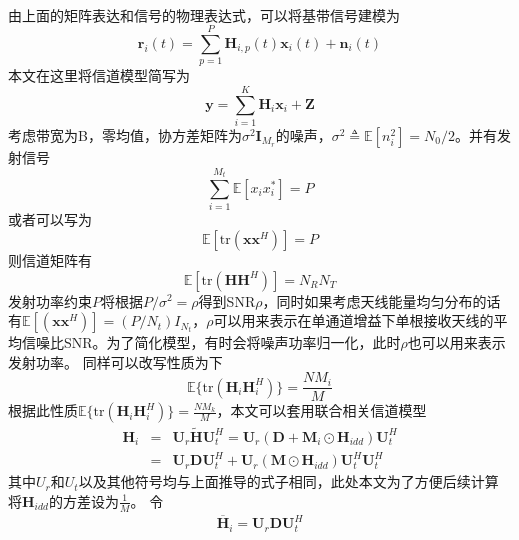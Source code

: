 \documentclass[bachelor,nocolorlinks, printoneside]{seuthesis} %
\begin{document}
\begin{Main}
\begin{eqnarray}
\end{eqnarray}
由上面的矩阵表达和信号的物理表达式，可以将基带信号建模为
\begin{equation}\label{key}
\mathbf{r}_{i}(t) = \sum_{p=1}^{P}\mathbf{H}_{i,p}(t)\mathbf{x}_{i}(t) + \mathbf{n}_{i}(t)
\end{equation}
本文在这里将信道模型简写为
\begin{equation}\label{key}
\mathbf{y} = \sum_{i=1}^{K} \mathbf{H}_i \mathbf{x}_i + \mathbf{Z}
\end{equation}
考虑带宽为B，零均值，协方差矩阵为$\sigma^{2}\mathbf{I}_{M_{r}}$的噪声，$\sigma^{2} \triangleq \mathbb{E}[n^{2}_{i}]= N_{0}/2$。并有发射信号
\begin{equation}\label{key}
\sum_{i=1}^{M_{t}}\mathbb{E}[x_{i}x_{i}^{*}] = P
\end{equation}
或者可以写为
\begin{equation}\label{key}
\mathbb{E}[\mathrm{tr}(\mathbf{x}\mathbf{x}^{H})] = P
\end{equation}
则信道矩阵有
\begin{equation}\label{key}
\mathbb{E}[\mathrm{tr}(\mathbf{H}\mathbf{H}^{H})] = N_{R}N_{T}
\end{equation}
发射功率约束$P$将根据$P/\sigma^{2} = \rho$得到SNR$\rho$，同时如果考虑天线能量均匀分布的话有$\mathbb{E}[(\mathbf{x}\mathbf{x}^{H})] = (P/N_{t})I_{N_{t}} $，$\rho$可以用来表示在单通道增益下单根接收天线的平均信噪比SNR。为了简化模型，有时会将噪声功率归一化，此时$\rho$也可以用来表示发射功率。
同样可以改写性质为下
\begin{equation}\label{key}
\mathbb{E} \lbrace \mathrm{tr} (\mathbf{H}_i \mathbf{H}_i^H ) \rbrace = \frac{N M_i}{M}
\end{equation}
根据此性质$\mathbb{E} \lbrace \mathrm{tr} (\mathbf{H}_i \mathbf{H}_i^H ) \rbrace = \frac{N M_k}{M}$，本文可以套用联合相关信道模型
\begin{eqnarray}\label{key}
\mathbf{H}_i & = & \mathbf{U}_{r}\tilde{\mathbf{H}}\mathbf{U}_{t}^{H} = \mathbf{U}_{r}(\mathbf{D}+\mathbf{M}_i\odot \mathbf{H}_{idd})\mathbf{U}_{t}^{H} \\ \nonumber
& = & \mathbf{U}_{r}\mathbf{D}\mathbf{U}_{t}^{H} + \mathbf{U}_{r}(\mathbf{M}\odot \mathbf{H}_{idd})\mathbf{U}_{t}^{H}\mathbf{U}_{t}^{H}
\end{eqnarray}
其中$U_r$和$U_t$以及其他符号均与上面推导的式子相同，此处本文为了方便后续计算将$\mathbf{H}_{idd}$的方差设为$\frac{1}{M}$。
令
\begin{gather}\label{key}
\overline{\mathbf{H}}_i = \mathbf{U}_{r}\mathbf{D}\mathbf{U}_{t}^{H} \\

\end{gather}
\end{Main}
\end{document}
